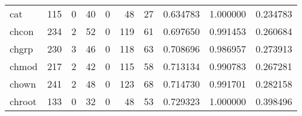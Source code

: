 \begin{longtable}{lrrrrrrrrr}
cat       &                                                115 &                                                  0 &                                                 40 &                                                  0 &                                                 48 &                                                 27 &                                           0.634783 &                               1.000000 &                             0.234783 \\
chcon     &                                                234 &                                                  2 &                                                 52 &                                                  0 &                                                119 &                                                 61 &                                           0.697650 &                               0.991453 &                             0.260684 \\
chgrp     &                                                230 &                                                  3 &                                                 46 &                                                  0 &                                                118 &                                                 63 &                                           0.708696 &                               0.986957 &                             0.273913 \\
chmod     &                                                217 &                                                  2 &                                                 42 &                                                  0 &                                                115 &                                                 58 &                                           0.713134 &                               0.990783 &                             0.267281 \\
chown     &                                                241 &                                                  2 &                                                 48 &                                                  0 &                                                123 &                                                 68 &                                           0.714730 &                               0.991701 &                             0.282158 \\
chroot    &                                                133 &                                                  0 &                                                 32 &                                                  0 &                                                 48 &                                                 53 &                                           0.729323 &                               1.000000 &                             0.398496 \\

\end{longtable}
